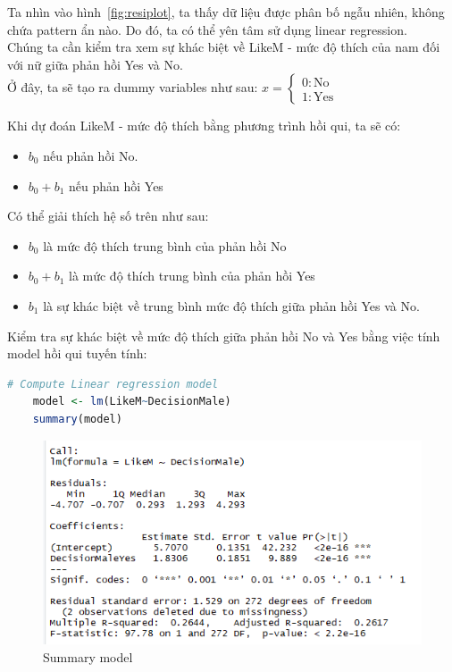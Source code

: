 \documentclass[a4paper,12pt]{article}
\begin{document}
	Ta nhìn vào hình~\ref{fig:resiplot}, ta thấy dữ liệu được phân bố ngẫu nhiên, không chứa pattern ẩn nào. Do đó, ta có thể yên tâm sử dụng linear regression.\\
	
	Chúng ta cần kiểm tra xem sự khác biệt về LikeM - mức độ thích của nam đối với nữ giữa phản hồi Yes và No.\\ 
	
	Ở đây, ta sẽ tạo ra dummy variables như sau:
	$x = \begin{cases}
		0: \text{No}\\
		1: \text{Yes}
	\end{cases}$
	
	Khi dự đoán LikeM - mức độ thích bằng phương trình hồi qui, ta sẽ có:
	\begin{itemize}
		\item $b_0$ nếu phản hồi No.
		\item $b_0 + b_1$ nếu phản hồi Yes
	\end{itemize}
	
	Có thể giải thích hệ số trên như sau:
	\begin{itemize}
		\item $b_0$ là mức độ thích trung bình của phản hồi No
		\item $b_0 + b_1$ là mức độ thích trung bình của phản hồi Yes
		\item $b_1$ là sự khác biệt về trung bình mức độ thích giữa phản hồi Yes và No.
	\end{itemize}
	
	Kiểm tra sự khác biệt về mức độ thích giữa phản hồi No và Yes bằng việc tính model hồi qui tuyến tính:
	\begin{lstlisting}[language=R]
	# Compute Linear regression model
	model <- lm(LikeM~DecisionMale)
	summary(model)
	\end{lstlisting}
	
	\begin{figure}[H]
		\centering
		\includegraphics[width=0.7\linewidth]{model1}
		\caption{Summary model}
		\label{fig:model1}
	\end{figure}
	
\end{document}
